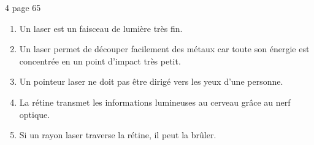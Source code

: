 \begin{myact}{4 page 65}
	\begin{enumerate}
		\item Un laser est un faisceau de lumière très fin.\pause
		\item Un laser permet de découper facilement des métaux car toute son énergie est concentrée  en un point d'impact très petit.\pause
		\item Un pointeur laser ne doit pas être dirigé vers les yeux d'une personne.\pause
		\item La rétine transmet les informations lumineuses au cerveau grâce au nerf optique.\pause
		\item Si un rayon laser traverse la rétine, il peut la brûler.
	\end{enumerate}
\end{myact}